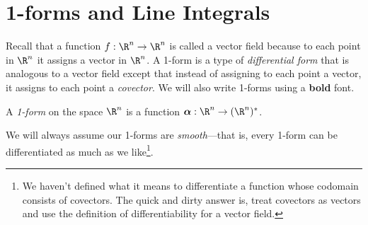 \begin{center}
\end{center}


\section{1-forms and Line Integrals}

Recall that a function $f:\R^n\to\R^n$ is called a
vector field because to each point in $\R^n$ it assigns a
vector in $\R^n$.  A 1-form is a type of \emph{differential 
form} that is analogous to a vector field
except that instead of assigning to each point a vector,
it assigns to each point a \emph{covector}.  We will also write
1-forms using a \textbf{bold} font.

\begin{definition}[1-form]
	A \emph{1-form} on the space $\R^n$ is a function
	$\bm \alpha: \R^n\to (\R^n)^*$.
\end{definition}
We will always assume our 1-forms are \emph{smooth}---that is, every 1-form
can be differentiated as much as we like\footnote{ We haven't defined
what it means to differentiate a function whose codomain consists of covectors.
The quick and dirty answer is, treat covectors as vectors and use
the definition of differentiability for a vector field.}.

